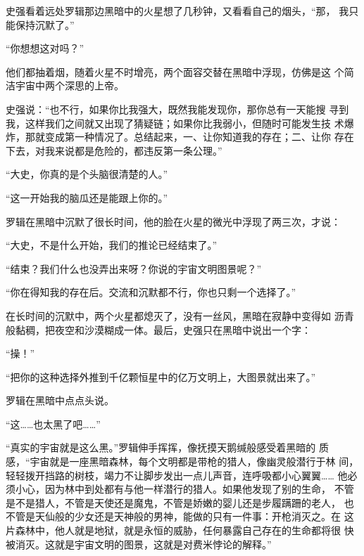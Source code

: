 史强看着远处罗辑那边黑暗中的火星想了几秒钟，又看看自己的烟头，“那，
我只能保持沉默了。”

“你想想这对吗？”

他们都抽着烟，随着火星不时增亮，两个面容交替在黑暗中浮现，仿佛是这
个简洁宇宙中两个深思的上帝。

史强说：“也不行，如果你比我强大，既然我能发现你，那你总有一天能搜
寻到我，这样我们之间就又出现了猜疑链；如果你比我弱小，但随时可能发生技
术爆炸，那就变成第一种情况了。总结起来，一、让你知道我的存在；二、让你
存在下去，对我来说都是危险的，都违反第一条公理。”

“大史，你真的是个头脑很清楚的人。”

“这一开始我的脑瓜还是能跟上你的。”

罗辑在黑暗中沉默了很长时间，他的脸在火星的微光中浮现了两三次，才说：

“大史，不是什么开始，我们的推论已经结束了。”

“结束？我们什么也没弄出来呀？你说的宇宙文明图景呢？”

“你在得知我的存在后。交流和沉默都不行，你也只剩一个选择了。”

在长时间的沉默中，两个火星都熄灭了，没有一丝风，黑暗在寂静中变得如
沥青般黏稠，把夜空和沙漠糊成一体。最后，史强只在黑暗中说出一个字：

“操！”

“把你的这种选择外推到千亿颗恒星中的亿万文明上，大图景就出来了。”

罗辑在黑暗中点点头说。

“这……也太黑了吧……”

“真实的宇宙就是这么黑。”罗辑伸手挥挥，像抚摸天鹅缄般感受着黑暗的
质感，“宇宙就是一座黑暗森林，每个文明都是带枪的猎人，像幽灵般潜行于林
间，轻轻拨开挡路的树枝，竭力不让脚步发出一点儿声音，连呼吸都小心翼翼……
他必须小心，因为林中到处都有与他一样潜行的猎人。如果他发现了别的生命，
不管是不是猎人，不管是天使还是魔鬼，不管是娇嫩的婴儿还是步履蹒跚的老人，
也不管是天仙般的少女还是天神般的男神，能做的只有一件事：开枪消灭之。在
这片森林中，他人就是地狱，就是永恒的威胁，任何暴露自己存在的生命都将很
快被消灭。这就是宇宙文明的图景，这就是对费米悖论的解释。”
